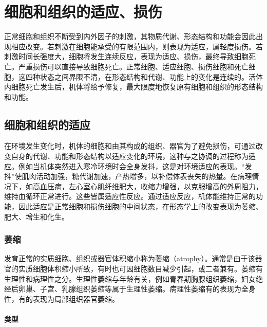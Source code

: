 \chapter{细胞和组织的适应、损伤}


正常细胞和组织不断受到内外因子的刺激，其物质代谢、形态结构和功能会因此出现相应改变。若刺激在细胞能承受的有限范围内，则表现为适应，属轻度损伤。若刺激时间长强度大，细胞将发生连续反应，表现为适应、损伤，最终导致细胞死亡。严重损伤可以直接导致细胞死亡。正常细胞、适应细胞、损伤细胞和死亡细胞，这四种状态之间界限不清，在形态结构和代谢、功能上的变化是连续的。活体内细胞死亡发生后，机体将给予修复，最大限度地恢复原有细胞和组织的形态结构和功能。

\section{细胞和组织的适应}

在环境发生变化时，机体的细胞和由其构成的组织、器官为了避免损伤，可通过改变自身的代谢、功能和形态结构以适应变化的环境，这种与之协调的过程称为适应。例如当机体突然进入寒冷环境时会全身发抖，这是对环境适应的表现。“发抖”使肌肉活动加强，糖代谢加速，产热增多，以补偿体表丧失的热量。在病理情况下，如高血压病，左心室心肌纤维肥大，收缩力增强，以克服增高的外周阻力，维持血循环正常进行。这些皆属适应性反应。通过适应反应，机体能维持正常的功能，因此适应是正常细胞和损伤细胞的中间状态，在形态学上的改变表现为萎缩、肥大、增生和化生。

\subsection{萎缩}

发育正常的实质细胞、组织或器官体积缩小称为萎缩（atrophy）。通常是由于该器官的实质细胞体积缩小所致，有时也可因细胞数目减少引起，或二者兼有。萎缩有生理性和病理性之分。生理性萎缩与年龄有关，例如青春期胸腺组织萎缩，妇女绝经后卵巢、子宫、乳腺组织萎缩等属于生理性萎缩。病理性萎缩有的表现为全身性，有的表现为局部组织器官萎缩。

\subsubsection{类型}

